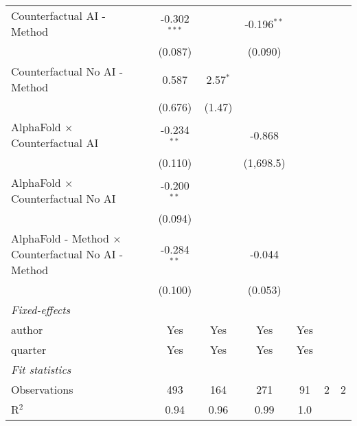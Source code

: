 \begin{tabular}{lcccccc}
   Counterfactual AI - Method                                 & -0.302$^{***}$ &            & -0.196$^{**}$ &           &     &   \\   
                                                              & (0.087)        &            & (0.090)       &           &     &   \\   
   Counterfactual No AI - Method                              & 0.587          & 2.57$^{*}$ &               &           &     &   \\   
                                                              & (0.676)        & (1.47)     &               &           &     &   \\   
   AlphaFold $\times$ Counterfactual AI                       & -0.234$^{**}$  &            & -0.868        &           &     &   \\   
                                                              & (0.110)        &            & (1,698.5)     &           &     &   \\   
   AlphaFold $\times$ Counterfactual No AI                    & -0.200$^{**}$  &            &               &           &     &   \\   
                                                              & (0.094)        &            &               &           &     &   \\   
   AlphaFold - Method $\times$ Counterfactual No AI - Method  & -0.284$^{**}$  &            & -0.044        &           &     &   \\   
                                                              & (0.100)        &            & (0.053)       &           &     &   \\   
   \midrule
   \emph{Fixed-effects}\\
   author                                                     & Yes            & Yes        & Yes           & Yes       &     & \\  
   quarter                                                    & Yes            & Yes        & Yes           & Yes       &     & \\  
   \midrule
   \emph{Fit statistics}\\
   Observations                                               & 493            & 164        & 271           & 91        & 2   & 2\\  
   R$^2$                                                      & 0.94           & 0.96       & 0.99          & 1.0       &     & \\  

\end{tabular}
